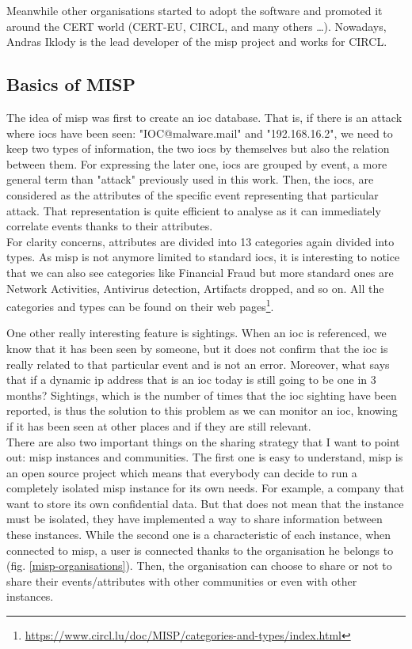 \documentclass{eplmastersthesis}
\begin{document}
Meanwhile other organisations started to adopt the software and promoted it around the CERT world (CERT-EU, CIRCL, and many others …). Nowadays, Andras Iklody is the lead developer of the \gls{misp} project and works for CIRCL.\\

\subsection{Basics of MISP}
The idea of \gls{misp} was first to create an \gls{ioc} database. That is, if there is an attack where \glspl{ioc} have been seen: "IOC@malware.mail" and "192.168.16.2", we need to keep two types of information, the two \glspl{ioc} by themselves but also the relation between them. For expressing the later one, \glspl{ioc} are grouped by event, a more general term than "attack" previously used in this work.  Then, the \glspl{ioc}, are considered as the attributes of the specific event representing that particular attack.
That representation is quite efficient to analyse as it can immediately correlate events thanks to their attributes.\\

For clarity concerns, attributes are divided into 13 categories again divided into types. As \gls{misp} is not anymore limited to standard \glspl{ioc}, it is interesting to notice that we can also see categories like Financial Fraud but more standard ones are Network Activities, Antivirus detection, Artifacts dropped, and so on.
All the categories and types can be found on their web pages\footnote {\url{https://www.circl.lu/doc/MISP/categories-and-types/index.html}}.

One other really interesting feature is sightings. When an \gls{ioc} is referenced, we know that it has been seen by someone, but it does not confirm that the \gls{ioc} is really related to that particular event and is not an error. Moreover, what says that if a dynamic \gls{ip} address that is an \gls{ioc} today is still going to be one in 3 months? 
Sightings, which is the number of times that the \gls{ioc} sighting have been reported, is thus the solution to this problem as we can monitor an \gls{ioc}, knowing if it has been seen at other places and if they are still relevant.\\


There are also two important things on the sharing strategy that I want to point out: \gls{misp} instances and communities. The first one is easy to understand, \gls{misp} is an open source project which means that everybody can decide to run a completely isolated \gls{misp} instance for its own needs. For example, a company that want to store its own confidential data. But that does not mean that the instance must be isolated, they have implemented a way to share information between these instances. While the second one is a characteristic of each instance, when connected to \gls{misp}, a user is connected thanks to the organisation he belongs to (fig. \ref{misp-organisations}). Then, the organisation can choose to share or not to share their events/attributes with other communities or even with other instances. \\ 
\end{document}
